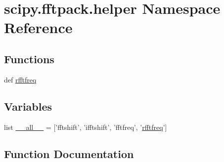 \hypertarget{namespacescipy_1_1fftpack_1_1helper}{}\section{scipy.\+fftpack.\+helper Namespace Reference}
\label{namespacescipy_1_1fftpack_1_1helper}
\subsection*{Functions}
\begin{DoxyCompactItemize}
\item 
def \hyperlink{namespacescipy_1_1fftpack_1_1helper_a386a02d147f45c4f3de7d12dde1b2ad9}{rfftfreq}
\end{DoxyCompactItemize}
\subsection*{Variables}
\begin{DoxyCompactItemize}
\item 
list \hyperlink{namespacescipy_1_1fftpack_1_1helper_a06b96b47252a6a00c76c8139e09b71bb}{\+\_\+\+\_\+all\+\_\+\+\_\+} = \mbox{[}'fftshift', 'ifftshift', 'fftfreq', '\hyperlink{namespacescipy_1_1fftpack_1_1helper_a386a02d147f45c4f3de7d12dde1b2ad9}{rfftfreq}'\mbox{]}
\end{DoxyCompactItemize}


\subsection{Function Documentation}
\hypertarget{namespacescipy_1_1fftpack_1_1helper_a386a02d147f45c4f3de7d12dde1b2ad9}{}
